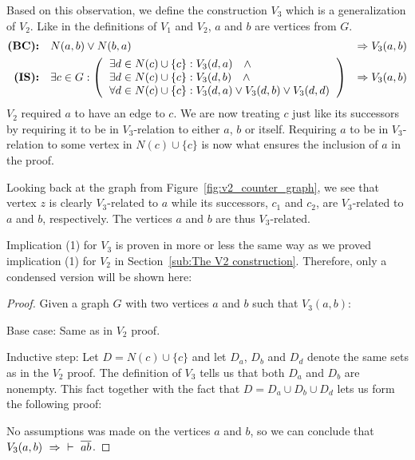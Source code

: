 Based on this observation, we define the construction $V_3$ which is a generalization of $V_2$.
Like in the definitions of $V_1$ and $V_2$, $a$ and $b$ are vertices from $G$.
\begin{align}
  \textbf{(BC):}&\quad N(a,b) \vee N(b,a) &\Rightarrow V_3(a,b)\label{eq:V3_BC}\\
  \textbf{(IS):}&\quad \exists c \in G:
  \left ( \begin{tabular}{l}
  $\exists d \in N(c) \cup \{ c \} : V_3(d,a) \quad \wedge$\\
  $\exists d \in N(c) \cup \{ c \} : V_3(d,b) \quad \wedge$\\
  $\forall d \in N(c) \cup \{ c \} : V_3(d,a) \vee V_3(d,b) \vee V_3(d,d)$
  \end{tabular} \right )
  &\Rightarrow V_3(a,b)\label{eq:V3_IS}
\end{align}
$V_2$ required $a$ to have an edge to $c$.
We are now treating $c$ just like its successors by requiring it to be in $V_3$-relation to either $a$, $b$ or itself.
Requiring $a$ to be in $V_3$-relation to some vertex in $N(c) \cup \{ c \}$ is now what ensures the inclusion of $a$ in the proof.

Looking back at the graph from Figure~\ref{fig:v2_counter_graph}, we see that vertex $z$ is clearly $V_3$-related to $a$ while its successors, $c_1$ and $c_2$, are $V_3$-related to $a$ and $b$, respectively.
The vertices $a$ and $b$ are thus $V_3$-related.

Implication (1) for $V_3$ is proven in more or less the same way as we proved implication (1) for $V_2$ in Section~\ref{sub:The V2 construction}.
Therefore, only a condensed version will be shown here:
\begin{proof}
  Given a graph $G$ with two vertices $a$ and $b$ such that $V_3(a,b)$:

  Base case: Same as in $V_2$ proof.

  Inductive step: Let $D = N(c) \cup \{ c \}$ and let $D_a$, $D_b$ and $D_d$ denote the same sets as in the $V_2$ proof.
  The definition of $V_3$ tells us that both $D_a$ and $D_b$ are nonempty.
  This fact together with the fact that $D = D_a \cup D_b \cup D_d$ lets us form the following proof:\par
  \begin{figure}[!h]
    \centering
    \begin{prooftree*}
    \end{prooftree*}
    \caption{}
    \label{fig:proof_v3}
  \end{figure}
  No assumptions was made on the vertices $a$ and $b$, so we can conclude that $V_3(a,b)~\Rightarrow~\;\vdash~\ol{ab}$.
\end{proof}
